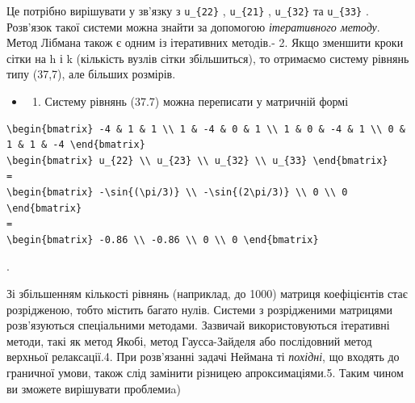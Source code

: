 \documentclass[
  ukrainian,
]{article}
\providecommand{\tightlist}{%
  \setlength{\itemsep}{0pt}\setlength{\parskip}{0pt}}
\begin{document}
Це потрібно вирішувати у зв'язку з \texttt{u\_\{22\}} ,
\texttt{u\_\{21\}} , \texttt{u\_\{32\}} та \texttt{u\_\{33\}} .
Розв'язок такої системи можна знайти за допомогою \emph{ітеративного
методу}. Метод Лібмана також є одним із ітеративних методів.- 2. Якщо
зменшити кроки сітки на h і k (кількість вузлів сітки збільшиться), то
отримаємо систему рівнянь типу (37,7), але більших розмірів.

\begin{itemize}
\tightlist
\item
  \begin{enumerate}
  \def\labelenumi{\arabic{enumi}.}
  \setcounter{enumi}{2}
  \tightlist
  \item
    Систему рівнянь (37.7) можна переписати у матричній формі
  \end{enumerate}
\end{itemize}

\begin{verbatim}
\begin{bmatrix} -4 & 1 & 1 \\ 1 & -4 & 0 & 1 \\ 1 & 0 & -4 & 1 \\ 0 & 1 & 1 & -4 \end{bmatrix}
\begin{bmatrix} u_{22} \\ u_{23} \\ u_{32} \\ u_{33} \end{bmatrix}
=
\begin{bmatrix} -\sin{(\pi/3)} \\ -\sin{(2\pi/3)} \\ 0 \\ 0 \end{bmatrix}
=
\begin{bmatrix} -0.86 \\ -0.86 \\ 0 \\ 0 \end{bmatrix}
\end{verbatim}

.

Зі збільшенням кількості рівнянь (наприклад, до 1000) матриця
коефіцієнтів стає розрідженою, тобто містить багато нулів. Системи з
розрідженими матрицями розв'язуються спеціальними методами. Зазвичай
використовуються ітеративні методи, такі як метод Якобі, метод
Гаусса-Зайделя або послідовний метод верхньої релаксації.4. При
розв'язанні задачі Неймана ті \emph{похідні}, що входять до граничної
умови, також слід замінити різницею апроксимаціями.5. Таким чином ви
зможете вирішувати проблемиa)
\end{document}
